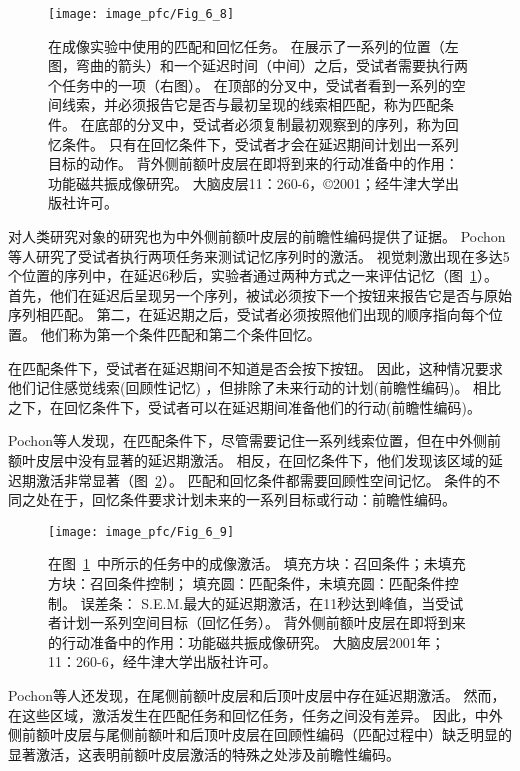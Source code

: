 \begin{figure}
	\centering
	\texttt{[image: image\_pfc/Fig\_6\_8]}
	\caption{在成像实验中使用的匹配和回忆任务。
		在展示了一系列的位置（左图，弯曲的箭头）和一个延迟时间（中间）之后，受试者需要执行两个任务中的一项（右图）。
		在顶部的分叉中，受试者看到一系列的空间线索，并必须报告它是否与最初呈现的线索相匹配，称为匹配条件。
		在底部的分叉中，受试者必须复制最初观察到的序列，称为回忆条件。
		只有在回忆条件下，受试者才会在延迟期间计划出一系列目标的动作。
		背外侧前额叶皮层在即将到来的行动准备中的作用：功能磁共振成像研究。
		大脑皮层11：260-6，©2001；经牛津大学出版社许可。}
	\label{fig:6_8}
\end{figure}


对人类研究对象的研究也为中外侧前额叶皮层的前瞻性编码提供了证据。
Pochon等人\cite{pochon2001role}研究了受试者执行两项任务来测试记忆序列时的激活。
视觉刺激出现在多达5个位置的序列中，在延迟6秒后，实验者通过两种方式之一来评估记忆（图~\ref{fig:6_8}）。
首先，他们在延迟后呈现另一个序列，被试必须按下一个按钮来报告它是否与原始序列相匹配。
第二，在延迟期之后，受试者必须按照他们出现的顺序指向每个位置。
他们称为第一个条件匹配和第二个条件回忆。


在匹配条件下，受试者在延迟期间不知道是否会按下按钮。
因此，这种情况要求他们记住感觉线索(回顾性记忆) ，但排除了未来行动的计划(前瞻性编码)。
相比之下，在回忆条件下，受试者可以在延迟期间准备他们的行动(前瞻性编码)。


Pochon等人发现，在匹配条件下，尽管需要记住一系列线索位置，但在中外侧前额叶皮层中没有显著的延迟期激活。
相反，在回忆条件下，他们发现该区域的延迟期激活非常显著（图~\ref{fig:6_9}）。
匹配和回忆条件都需要回顾性空间记忆。
条件的不同之处在于，回忆条件要求计划未来的一系列目标或行动：前瞻性编码。


\begin{figure}
	\centering
	\texttt{[image: image\_pfc/Fig\_6\_9]}
	\caption{在图~\ref{fig:6_8}~中所示的任务中的成像激活。
		填充方块：召回条件；未填充方块：召回条件控制；
		填充圆：匹配条件，未填充圆：匹配条件控制。
		误差条： S.E.M.最大的延迟期激活，在11秒达到峰值，当受试者计划一系列空间目标（回忆任务）。
		背外侧前额叶皮层在即将到来的行动准备中的作用：功能磁共振成像研究。
		大脑皮层2001年；11：260-6，经牛津大学出版社许可。}
	\label{fig:6_9}
\end{figure}


Pochon等人还发现，在尾侧前额叶皮层和后顶叶皮层中存在延迟期激活。
然而，在这些区域，激活发生在匹配任务和回忆任务，任务之间没有差异。
因此，中外侧前额叶皮层与尾侧前额叶和后顶叶皮层在回顾性编码（匹配过程中）缺乏明显的显著激活，这表明前额叶皮层激活的特殊之处涉及前瞻性编码。


